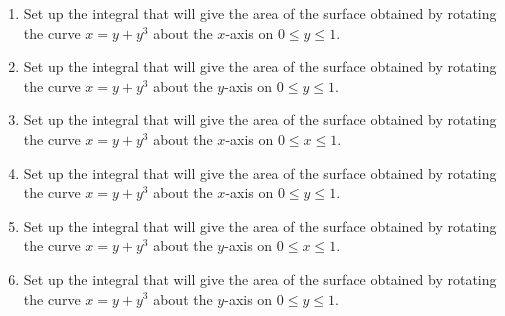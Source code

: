 \documentclass[12 pt]{article}
\begin{document}
\begin{enumerate}
\item Set up the integral that will give the area of the surface obtained by rotating the curve $x=y+y^3$ about the $x$-axis on $0 \leq y \leq 1 $. 

\item Set up the integral that will give the area of the surface obtained by rotating the curve $x=y+y^3$ about the $y$-axis on $0 \leq y \leq 1$. 

\newpage

\item Set up the integral that will give the area of the surface obtained by rotating the curve $x=y+y^3$ about the $x$-axis on $0 \leq x \leq1 $. 

\item Set up the integral that will give the area of the surface obtained by rotating the curve $x=y+y^3$ about the $x$-axis on $0 \leq y \leq1 $. 

\item Set up the integral that will give the area of the surface obtained by rotating the curve $x=y+y^3$ about the $y$-axis on  $0 \leq x \leq1 $. 

\item Set up the integral that will give the area of the surface obtained by rotating the curve $x=y+y^3$ about the $y$-axis on  $0 \leq y \leq1 $. 


\end{enumerate}
\end{document}
